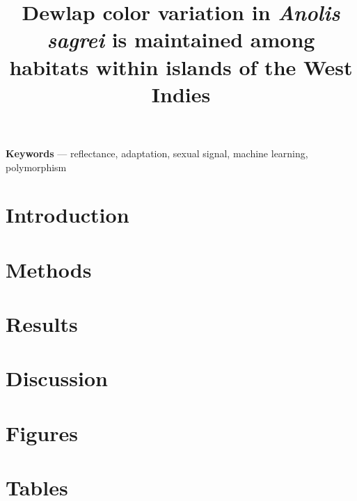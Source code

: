 \documentclass{article}
\title{Dewlap color variation in \textit{Anolis sagrei} is maintained among habitats within islands of the West Indies}
\date{}
\begin{document}
	
	\linenumbers
	
	\maketitle
	
	\begin{abstract}
		
	\end{abstract}
	
	\textbf{Keywords} --- reflectance, adaptation, sexual signal, machine learning, polymorphism
	
	\section*{Introduction}
	
	
	
	\pagebreak
	
	\section*{Methods}
	
	
	
	\pagebreak
	
	\section*{Results}
	
	
	
	\pagebreak
	
	\section*{Discussion}
	
	
	
	\pagebreak
	
	\section*{Figures}
	
	
	
	\pagebreak
	
	\section*{Tables}
	
	
	
\end{document}
